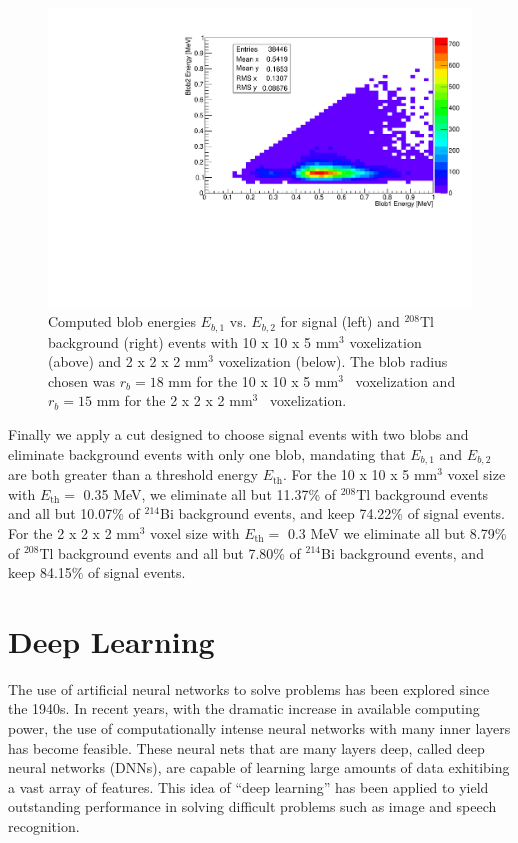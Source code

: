 \documentclass[a4paper,11pt]{article}
\begin{document}
\begin{figure}[!htb]
	\includegraphics[scale = 0.35]{fig/blob1vsblob2_Paolina222_Bi214.pdf}
	\caption{Computed blob energies $E_{b,1}$ vs. $E_{b,2}$ for signal (left) and $^{208}$Tl background (right) events with 10 x 10 x 5 mm$^3$ voxelization (above) and 2 x 2 x 2 mm$^3$ voxelization (below).  The blob radius chosen was $r_b = 18$ mm for the 10 x 10 x 5 mm$^3$~ voxelization and $r_b = 15$ mm for the 2 x 2 x 2 mm$^3$~ voxelization.} \label{fig.blobcuts}
\end{figure}

Finally we apply a cut designed to choose signal events with two blobs and eliminate background events with only one blob, mandating that $E_{b,1}$ and $E_{b,2}$ are both greater than a threshold energy $E_{\mathrm{th}}$.  For the 10 x 10 x 5 mm$^3$ voxel size with $E_{\mathrm{th}} =$ 0.35 MeV, we eliminate all but 11.37\% of $^{208}$Tl background events and all but 10.07\% of $^{214}$Bi background events, and keep 74.22\% of signal events.  For the 2 x 2 x 2 mm$^3$ voxel size with $E_{\mathrm{th}} =$ 0.3 MeV we eliminate all but 8.79\% of $^{208}$Tl background events and all but 7.80\% of $^{214}$Bi background events, and keep 84.15\% of signal events. %

\section{Deep Learning}
The use of artificial neural networks to solve problems has been explored since the 1940s.  In recent years, with the dramatic increase in available computing power, the use of computationally
intense neural networks with many inner layers has become feasible.  These neural nets that are many layers deep, called deep neural networks (DNNs), are capable of learning large
amounts of data exhitibing a vast array of features.  This idea of ``deep learning'' has been applied to yield outstanding performance in solving difficult problems such as image and 
speech recognition.
\end{document}
